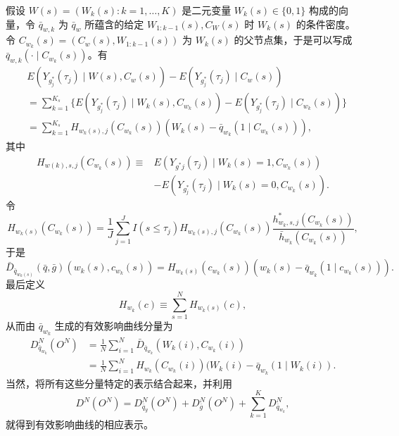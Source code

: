假设 $W(s)=(W_k(s):k=1,\ldots,K)$ 是二元变量 $W_k(s)\in\{0,1\}$ 构成的向量，令 $\bar q_{w,k}$ 为 $\bar q_w$ 所蕴含的给定 $W_{1:k-1}(s),C_W(s)$ 时 $W_k(s)$ 的条件密度。令 $C_{w_k}(s)=(C_w(s),W_{1:k-1}(s))$ 为 $W_k(s)$ 的父节点集，于是可以写成 $\bar q_{w,k}(\cdot\mid C_{w_k}(s))$。有
\[
\begin{aligned}
 &E(Y_{g_j^*}(\tau_j)\mid W(s),C_w(s))-E(Y_{g_j^*}(\tau_j)\mid C_w(s))\\
 &=\sum_{k=1}^{K_s}\{E(Y_{g_j^*}(\tau_j)\mid W_k(s),C_{w_k}(s))
 -E(Y_{g_j^*}(\tau_j)\mid C_{w_k}(s))\}\\
 &=\sum_{k=1}^{K_s}H_{w_k(s),j}(C_{w_k}(s))(W_k(s)-\bar q_{w_k}(1\mid C_{w_k}(s))),
\end{aligned}
\]
其中
\[
\begin{aligned}
 H_{w(k),s,j}(C_{w_k}(s))\equiv{}&E(Y_{g^*j}(\tau_j)\mid W_k(s)=1,C_{w_k}(s))\\
 &-E(Y_{g_j^*}(\tau_j)\mid W_k(s)=0,C_{w_k}(s)).
\end{aligned}
\]
令
\[
 H_{w_k(s)}(C_{w_k}(s))=\frac1J\sum_{j=1}^J I(s\leq\tau_j)
 H_{w_k(s),j}(C_{w_k}(s))\frac{h^*_{w_k,s,j}(C_{w_k}(s))}{\bar h_{w_k}(C_{w_k}(s))},
\]
于是
\[
 \bar D_{\bar q_{w_k(s)}}(\bar q,\bar g)(w_k(s),c_{w_k}(s))
 =H_{w_k(s)}(c_{w_k}(s))(w_k(s)-\bar q_{w_k}(1\mid c_{w_k}(s))).
\]
最后定义
\begin{equation}
 H_{w_k}(c)\equiv\sum_{s=1}^N H_{w_k(s)}(c),
 \tag{19.3}
\end{equation}
从而由 $\bar q_{w_k}$ 生成的有效影响曲线分量为
\[
\begin{aligned}
 D^N_{\bar q_{w_k}}(O^N)
 &=\frac1N\sum_{i=1}^N\bar D_{\bar q_{w_k}}(W_k(i),C_{w_k}(i))\\
 &=\frac1N\sum_{i=1}^N H_{w_k}(C_{w_k}(i))(W_k(i)-\bar q_{w_k}(1\mid W_k(i)).
\end{aligned}
\]
当然，将所有这些分量特定的表示结合起来，并利用
\[
 D^N(O^N)=D^N_{\bar q_y}(O^N)+D^N_{\bar g}(O^N)
 +\sum_{k=1}^K D^N_{\bar q_{w_k}},
\]
就得到有效影响曲线的相应表示。
